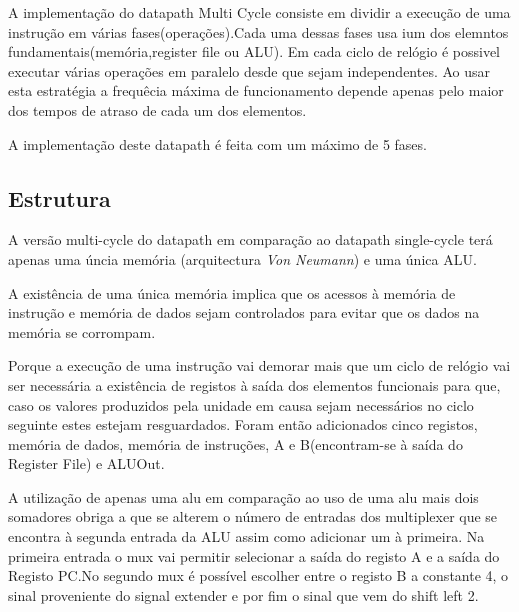 \documentclass[10pt,a4paper]{book}
\begin{document}
		    A implementação do datapath Multi Cycle consiste em dividir a execução de uma instrução em várias fases(operações).Cada uma dessas fases usa ium dos elemntos fundamentais(memória,register file ou ALU).
		    Em cada ciclo de relógio é possivel executar várias operações em paralelo desde que sejam independentes. Ao usar esta estratégia a frequêcia máxima de funcionamento depende apenas pelo maior dos tempos de atraso de cada um dos elementos.

		    A implementação deste datapath é feita com um máximo de 5 fases.

		    \subsection{Estrutura}

		    A versão multi-cycle do datapath em comparação ao datapath single-cycle terá apenas uma úncia memória (arquitectura \textit{Von Neumann}) e uma única ALU.

		    A existência de uma única memória implica que os acessos à memória de instrução e memória de dados sejam controlados para evitar que os dados na memória se corrompam.

		    Porque a execução de uma instrução vai demorar mais que um ciclo de relógio vai ser necessária a existência de registos à saída dos elementos funcionais para que, caso os valores produzidos pela unidade em causa sejam necessários no ciclo seguinte estes estejam resguardados. Foram então adicionados cinco registos, memória de dados, memória de instruções, A e B(encontram-se à saída do Register File) e ALUOut.

		    A utilização de apenas uma alu em comparação ao uso de uma alu mais dois somadores obriga a que se alterem o número de entradas dos multiplexer que se encontra à segunda entrada da ALU assim como adicionar um à primeira. Na primeira entrada o mux vai permitir selecionar a saída do registo A e a saída do Registo PC.No segundo mux é possível escolher entre o registo B a constante 4, o sinal proveniente do signal extender e por fim o sinal que vem do shift left 2.
\end{document}
